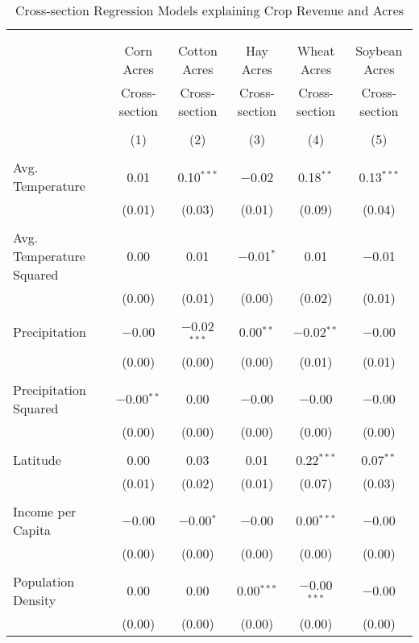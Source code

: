 \documentclass[10pt]{article}
\begin{document}
\begin{table}[!htbp] \centering 
  \caption{Cross-section Regression Models explaining Crop Revenue and Acres} 
  \label{} 
\footnotesize 
\begin{tabular}{@{\extracolsep{5pt}}lccccc} 
\\[-1.8ex]\hline 
\hline \\[-1.8ex] 
\\[-1.8ex] & Corn Acres & Cotton Acres & Hay Acres & Wheat Acres & Soybean Acres \\ 
 & Cross-section & Cross-section & Cross-section & Cross-section & Cross-section \\ 
\\[-1.8ex] & (1) & (2) & (3) & (4) & (5)\\ 
\hline \\[-1.8ex] 
 Avg. Temperature & 0.01 & 0.10$^{***}$ & $-$0.02 & 0.18$^{**}$ & 0.13$^{***}$ \\ 
  & (0.01) & (0.03) & (0.01) & (0.09) & (0.04) \\ 
  & & & & & \\ 
 Avg. Temperature Squared & 0.00 & 0.01 & $-$0.01$^{*}$ & 0.01 & $-$0.01 \\ 
  & (0.00) & (0.01) & (0.00) & (0.02) & (0.01) \\ 
  & & & & & \\ 
 Precipitation & $-$0.00 & $-$0.02$^{***}$ & 0.00$^{**}$ & $-$0.02$^{**}$ & $-$0.00 \\ 
  & (0.00) & (0.00) & (0.00) & (0.01) & (0.01) \\ 
  & & & & & \\ 
 Precipitation Squared & $-$0.00$^{**}$ & 0.00 & $-$0.00 & $-$0.00 & $-$0.00 \\ 
  & (0.00) & (0.00) & (0.00) & (0.00) & (0.00) \\ 
  & & & & & \\ 
 Latitude & 0.00 & 0.03 & 0.01 & 0.22$^{***}$ & 0.07$^{**}$ \\ 
  & (0.01) & (0.02) & (0.01) & (0.07) & (0.03) \\ 
  & & & & & \\ 
 Income per Capita & $-$0.00 & $-$0.00$^{*}$ & $-$0.00 & 0.00$^{***}$ & $-$0.00 \\ 
  & (0.00) & (0.00) & (0.00) & (0.00) & (0.00) \\ 
  & & & & & \\ 
 Population Density & 0.00 & 0.00 & 0.00$^{***}$ & $-$0.00$^{***}$ & $-$0.00 \\ 
  & (0.00) & (0.00) & (0.00) & (0.00) & (0.00) \\ 

\end{tabular}
\end{table}
\end{document}
